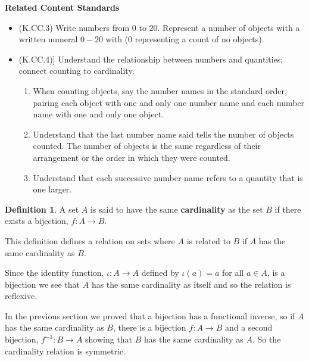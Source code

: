\documentclass[
]{book}
\providecommand{\tightlist}{%
  \setlength{\itemsep}{0pt}\setlength{\parskip}{0pt}}
\newenvironment{standards}{}{}
\theoremstyle{definition}
\newtheorem{definition}{Definition}[chapter]
\theoremstyle{definition}
\theoremstyle{definition}
\theoremstyle{definition}
\theoremstyle{remark}
\begin{document}
\begin{standards}

\begin{center}
\textbf{Related Content Standards}

\end{center}

\begin{itemize}
\tightlist
\item
  (K.CC.3) Write numbers from \(0\) to \(20\). Represent a number of objects with a written numeral \(0-20\) with (\(0\) representing a count of no objects).
\item
  (K.CC.4){]} Understand the relationship between numbers and quantities; connect counting to cardinality.

  \begin{enumerate}
  \def\labelenumi{\alph{enumi}.}
  \tightlist
  \item
    When counting objects, say the number names in the standard order, pairing each object with one and only one number name and each number name with one and only one object.
  \item
    Understand that the last number name said tells the number of objects counted. The number of objects is the same regardless of their arrangement or the order in which they were counted.
  \item
    Understand that each successive number name refers to a quantity that is one larger.
  \end{enumerate}
\end{itemize}

\end{standards}

\begin{definition}
A set \(A\) is said to have the same \textbf{cardinality} as the set \(B\) if there exists a bijection, \(f:A\rightarrow B\).
\end{definition}

This definition defines a relation on sets where \(A\) is related to \(B\) if \(A\) has the same cardinality as \(B\).

Since the identity function, \(\iota :A \rightarrow A\) defined by \(\iota(a)=a\) for all \(a\in A\), is a bijection we see that \(A\) has the same cardinality as itself and so the relation is reflexive.

In the previous section we proved that a bijection has a functional inverse, so if \(A\) has the same cardinality as \(B\), there is a bijection \(f:A\rightarrow B\) and a second bijection, \(f^{-1}:B\rightarrow A\) showing that \(B\) has the same cardinality as \(A\). So the cardinality relation is symmetric.
\end{document}
